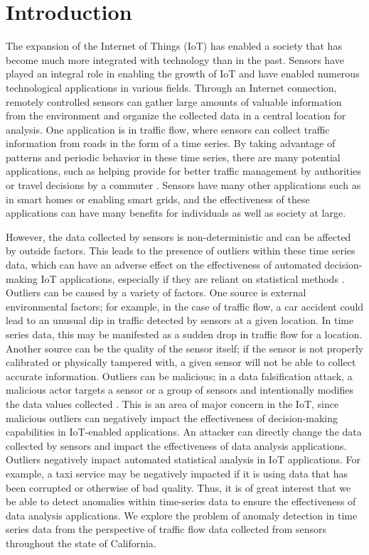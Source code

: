 \documentclass[conference]{IEEEtran}
\begin{document}
\section{Introduction}

The expansion of the Internet of Things (IoT) has enabled a society that has become much more integrated with technology than in the past. Sensors have played an integral role in enabling the growth of IoT and have enabled numerous technological applications in various fields. Through an Internet connection, remotely controlled sensors can gather large amounts of valuable information from the environment and organize the collected data in a central location for analysis. One application is in traffic flow, where sensors can collect traffic information from roads in the form of a time series. By taking advantage of patterns and periodic behavior in these time series, there are many potential applications, such as helping provide for better traffic management by authorities or travel decisions by a commuter \cite{ShuklaVehicleIOT}. Sensors have many other applications such as in smart homes or enabling smart grids, and the effectiveness of these applications can have many benefits for individuals as well as society at large.

However, the data collected by sensors is non-deterministic and can be affected by outside factors. This leads to the presence of outliers within these time series data, which can have an adverse effect on the effectiveness of automated decision-making IoT applications, especially if they are reliant on statistical methods \cite{Hochenbaum2017}. Outliers can be caused by a variety of factors. One source is external environmental factors; for example, in the case of traffic flow, a car accident could lead to an unusual dip in traffic detected by sensors at a given location. In time series data, this may be manifested as a sudden drop in traffic flow for a location. Another source can be the quality of the sensor itself; if the sensor is not properly calibrated or physically tampered with, a given sensor will not be able to collect accurate information. Outliers can be malicious; in a data falsification attack, a malicious actor targets a sensor or a group of sensors and intentionally modifies the data values collected \cite{Vempaty2013}. This is an area of major concern in the IoT, since malicious outliers can negatively impact the effectiveness of decision-making capabilities in IoT-enabled applications. An attacker can directly change the data collected by sensors and impact the effectiveness of data analysis applications. Outliers negatively impact automated statistical analysis in IoT applications. For example, a taxi service may be negatively impacted if it is using data that has been corrupted or otherwise of bad quality.  Thus, it is of great interest that we be able to detect anomalies within time-series data to ensure the effectiveness of data analysis applications. We explore the problem of anomaly detection in time series data from the perspective of traffic flow data collected from sensors throughout the state of California. 
\end{document}
